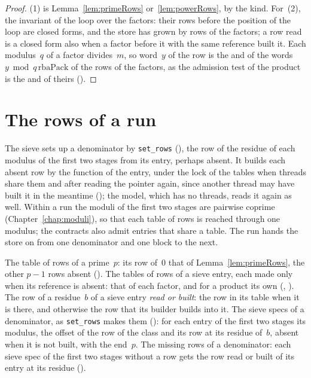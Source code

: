 \begin{proof}
  \leanok
  (1) is Lemma~\ref{lem:primeRows} or~\ref{lem:powerRows}, by the kind. For~(2), the invariant of
  the loop over the factors: their rows before the position of the loop are closed forms, and the
  store has grown by rows of the factors; a row read is a closed form also when a factor before it
  with the same reference built it. Each modulus~$q$ of a factor divides~$m$, so word~$y$ of the
  row is the and of the words $y \bmod q\,\mathrm{rbaPack}$ of the rows of the factors, as the
  admission test of the product is the and of theirs
  ().
\end{proof}

\section{The rows of a run}\label{sec:runRows}

The sieve sets up a denominator by \verb|set_rows| (), the row
of the residue of each modulus of the first two stages from its entry, perhaps absent. It builds
each absent row by the function of the entry, under the lock of the tables when threads share them
and after reading the pointer again, since another thread may have built it in the meantime
(); the model, which has no threads, reads it again as well.
Within a run the moduli of the first two stages are pairwise coprime (Chapter~\ref{chap:moduli}),
so that each table of rows is reached through one modulus; the contracts also admit entries that
share a table. The run hands the store on from one denominator and one block to the next.

\begin{definition}\label{def:runTables}
  \leanok
  The table of rows of a prime~$p$: its row of~$0$ that of Lemma~\ref{lem:primeRows}, the other
  $p - 1$ rows absent (). The tables of rows of a sieve entry,
  each made only when its reference is absent: that of each factor, and for a product its own
  (, ). The row of a
  residue~$b$ of a sieve entry \emph{read or built}: the row in its table when it is there, and
  otherwise the row that its builder builds into it. The sieve specs of a denominator, as
  \verb|set_rows| makes them (): for each entry of the first two
  stages its modulus, the offset of the row of the class and its row at its residue of~$b$, absent
  when it is not built, with the end~$p$. The missing rows of a denominator: each sieve spec of the
  first two stages without a row gets the row read or built of its entry at its residue
  ().
\end{definition}

